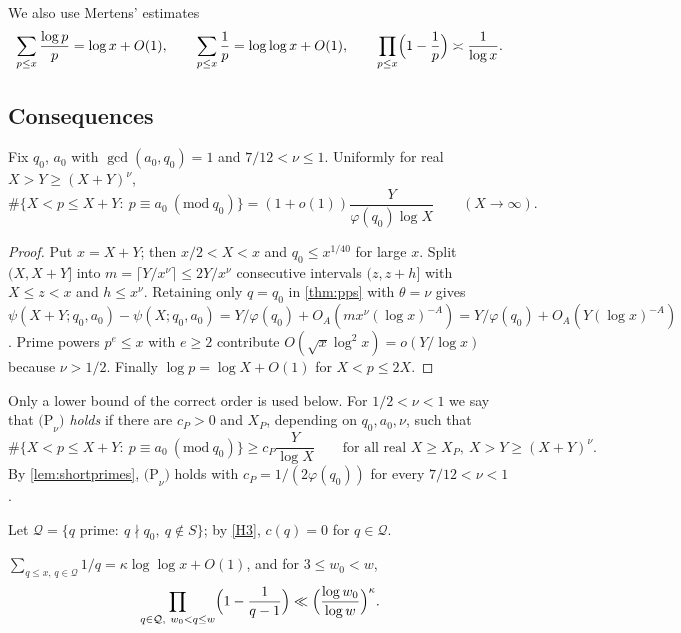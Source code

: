 \documentclass[11pt]{article}
\newcommand{\Qset}{\mathcal Q}
\begin{document}
We also use Mertens' estimates~\cite[Theorem~2.7]{MontgomeryVaughanBook}
\begin{equation}\label{eq:mertens}
\sum_{p\le x}\frac{\log p}{p}=\log x+O(1),\qquad
\sum_{p\le x}\frac1p=\log\log x+O(1),\qquad
\prod_{p\le x}\Bigl(1-\frac1p\Bigr)\asymp\frac1{\log x}.
\end{equation}

\subsection{Consequences}

\begin{lemma}\label{lem:shortprimes}
Fix $q_0$, $a_0$ with $\gcd(a_0,q_0)=1$ and $7/12<\nu\le1$. Uniformly for
real $X>Y\ge(X+Y)^\nu$,
\[
\#\{X<p\le X+Y:\ p\equiv a_0\ (\mathrm{mod}\ q_0)\}=(1+o(1))\frac{Y}{\varphi(q_0)\log X}\qquad(X\to\infty).
\]
\end{lemma}

\begin{proof}
Put $x=X+Y$; then $x/2<X<x$ and $q_0\le x^{1/40}$ for large $x$. Split
$(X,X+Y]$ into $m=\lceil Y/x^\nu\rceil\le2Y/x^\nu$ consecutive intervals
$(z,z+h]$ with $X\le z<x$ and $h\le x^\nu$. Retaining only $q=q_0$ in
\cref{thm:pps} with $\theta=\nu$ gives
$\psi(X+Y;q_0,a_0)-\psi(X;q_0,a_0)=Y/\varphi(q_0)+O_A(mx^\nu(\log x)^{-A})
=Y/\varphi(q_0)+O_A(Y(\log x)^{-A})$. Prime powers $p^e\le x$ with $e\ge2$
contribute $O(\sqrt x\log^2x)=o(Y/\log x)$ because $\nu>1/2$. Finally
$\log p=\log X+O(1)$ for $X<p\le 2X$.
\end{proof}

Only a lower bound of the correct order is used below. For $1/2<\nu<1$ we say
that \emph{$\mathrm{(P}_\nu\mathrm{)}$ holds} if there are $c_P>0$ and $X_P$,
depending on $q_0,a_0,\nu$, such that
\begin{equation}\label{eq:Pnu}
\#\{X<p\le X+Y:\ p\equiv a_0\ (\mathrm{mod}\ q_0)\}\ge c_P\frac{Y}{\log X}
\qquad\text{for all real }X\ge X_P,\ X>Y\ge(X+Y)^\nu .
\end{equation}
By \cref{lem:shortprimes}, $\mathrm{(P}_\nu\mathrm{)}$ holds with
$c_P=1/(2\varphi(q_0))$ for every $7/12<\nu<1$.

Let $\Qset=\{q\text{ prime}:\ q\nmid q_0,\ q\notin S\}$; by \ref{H3},
$c(q)=0$ for $q\in\Qset$.

\begin{lemma}\label{lem:harmonic}
$\sum_{q\le x,\,q\in\Qset}1/q=\kappa\log\log x+O(1)$, and for $3\le w_0<w$,
\[
\prod_{q\in\Qset,\ w_0<q\le w}\Bigl(1-\frac1{q-1}\Bigr)\ll\Bigl(\frac{\log w_0}{\log w}\Bigr)^{\kappa}.
\]
\end{lemma}
\end{document}
